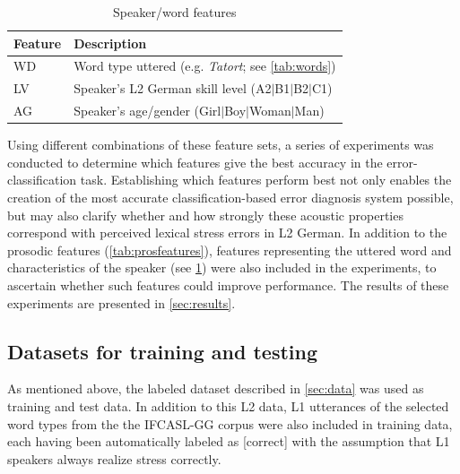\documentclass[a4paper]{article}
\begin{document}
		\begin{table}[!b]
			\centering
			\caption{Speaker/word features}
			\begin{tabularx}{\columnwidth}{lX}
			\toprule
			Feature & Description \\
			\midrule
			WD %
				& Word type uttered (e.g. \textit{Tatort}; see \cref{tab:words}) \\
			LV %
				& Speaker's L2 German skill level  (A2$|$B1$|$B2$|$C1)\\
			AG %
				& Speaker's age/gender  (Girl$|$Boy$|$Woman$|$Man)\\
			\bottomrule
			\end{tabularx}
			\label{tab:spkrfeatures}		
		\end{table}

		
		Using different combinations of these feature sets, a series of experiments was conducted to determine which features give the best accuracy in the error-classification task. Establishing which features perform best not only enables the creation of the most accurate classification-based error diagnosis system possible, but may also clarify whether and how strongly these acoustic properties correspond with perceived lexical stress errors in L2 German.
		 In addition to the prosodic features (\cref{tab:prosfeatures}), features representing the 
		 uttered word 
		 and characteristics of the speaker (see \cref{tab:spkrfeatures}) were also included in the experiments, to ascertain whether such features could improve performance.
		The results of these experiments are presented in \cref{sec:results}.
	    
	    \subsection{Datasets for training and testing}
	    \label{sec:method:datasets}

		As mentioned above, 
		the labeled dataset described in \cref{sec:data}
		was used as training and test data. 
		In addition to this L2 data, L1 utterances of the selected word types from the the IFCASL-GG corpus were also included in training data, each having been automatically labeled as [correct] with the assumption that L1 speakers always realize stress correctly.
\end{document}
